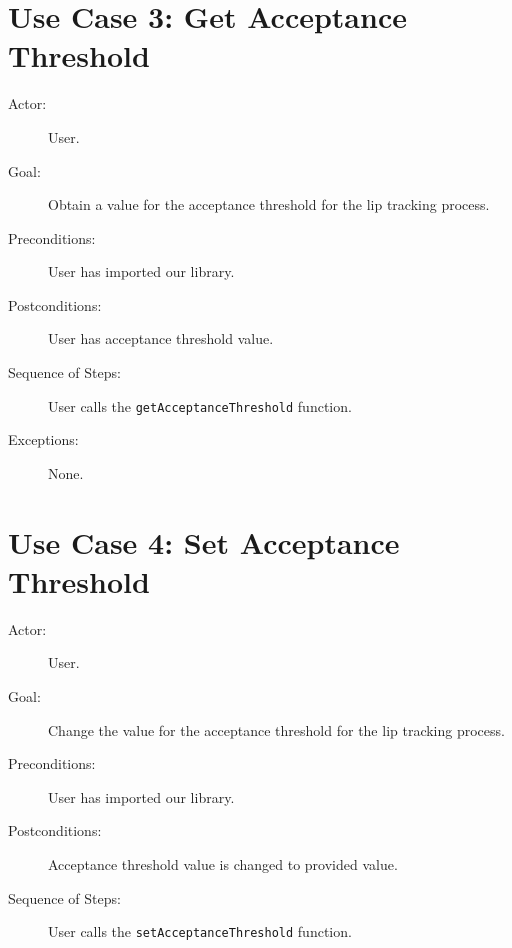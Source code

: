 \section{Use Case 3: Get Acceptance Threshold}

\begin{description}
  \item[Actor:] User.
  \item[Goal:] Obtain a value for the acceptance threshold for the lip tracking process.
  \item[Preconditions:] User has imported our library.
  \item[Postconditions:] User has acceptance threshold value.
  \item[Sequence of Steps:] User calls the \texttt{getAcceptanceThreshold} function.
  \item[Exceptions:] None.
\end{description}


\section{Use Case 4: Set Acceptance Threshold}

\begin{description}
  \item[Actor:] User.
  \item[Goal:] Change the value for the acceptance threshold for the lip tracking process.
  \item[Preconditions:] User has imported our library.
  \item[Postconditions:] Acceptance threshold value is changed to provided value.
  \item[Sequence of Steps:] User calls the \texttt{setAcceptanceThreshold} function.
\end{description}